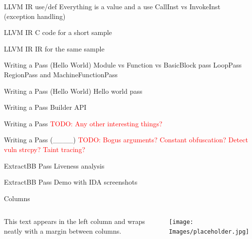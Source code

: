\documentclass{beamer}
\newcommand{\todo}[1]{\textcolor{red}{TODO: #1}}
\begin{document}
\begin{frame}{LLVM IR}
    use/def
    Everything is a value and a use
    CallInst vs InvokeInst (exception handling)
\end{frame}

\begin{frame}{LLVM IR}
    C code for a short sample
\end{frame}

\begin{frame}{LLVM IR}
    IR for the same sample
\end{frame}


\begin{frame}{Writing a Pass (Hello World)}
    Module vs Function vs BasicBlock pass
    LoopPass RegionPass and MachineFunctionPass
\end{frame}

\begin{frame}{Writing a Pass (Hello World)}
    Hello world pass
\end{frame}

\begin{frame}{Writing a Pass}
    Builder API
\end{frame}

\begin{frame}{Writing a Pass}
    \todo{Any other interesting things?}
\end{frame}


\begin{frame}{Writing a Pass (\_\_\_\_)}
    \todo{Bogus arguments? Constant obfuscation? Detect vuln strcpy? Taint tracing?}
\end{frame}


\begin{frame}{ExtractBB Pass}
    Liveness analysis
\end{frame}

\begin{frame}{ExtractBB Pass}
    Demo with IDA screenshots
\end{frame}


\begin{frame}{Columns}
    \begin{columns}
            This text appears in the left column and wraps neatly with a margin between columns.

            \texttt{[image: Images/placeholder.jpg]}
    \end{columns}
\end{frame}
\end{document}
